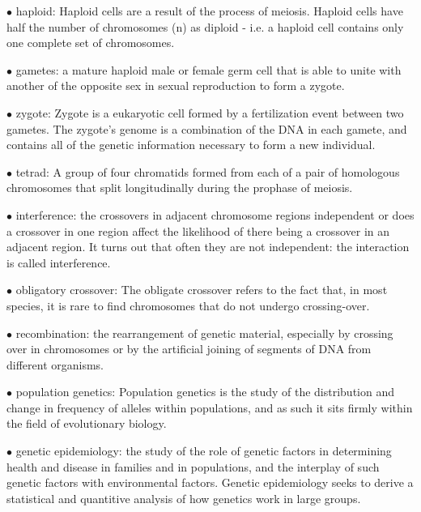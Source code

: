 \documentclass{article}
\begin{document}
\vspace{0.1in}
$\bullet$ haploid:
Haploid cells are a result of the process of meiosis. Haploid cells have half the number of chromosomes (n) as diploid - i.e. a haploid cell contains only one complete set of chromosomes.

\vspace{0.1in}
$\bullet$ gametes:
a mature haploid male or female germ cell that is able to unite with another of the opposite sex in sexual reproduction to form a zygote.


\vspace{0.1in}
$\bullet$ zygote:
 Zygote is a eukaryotic cell formed by a fertilization event between two gametes. The zygote's genome is a combination of the DNA in each gamete, and contains all of the genetic information necessary to form a new individual.

\vspace{0.1in}
$\bullet$ tetrad:
A group of four chromatids formed from each of a pair of homologous chromosomes that split longitudinally during the prophase of meiosis.


\vspace{0.1in}
$\bullet$ interference:
 the crossovers in adjacent chromosome regions independent or does a crossover in one region affect the likelihood of there being a crossover in an adjacent region. It turns out that often they are not independent: the interaction is called interference.


\vspace{0.1in}
$\bullet$ obligatory crossover:
The obligate crossover refers to the fact that, in most species, it is rare to find chromosomes that do not undergo crossing-over.


\vspace{0.1in}
$\bullet$ recombination:
the rearrangement of genetic material, especially by crossing over in chromosomes or by the artificial joining of segments of DNA from different organisms.


\vspace{0.1in}
$\bullet$ population genetics:
Population genetics is the study of the distribution and change in frequency of alleles within populations, and as such it sits firmly within the field of evolutionary biology.


\vspace{0.1in}
$\bullet$ genetic epidemiology:
 the study of the role of genetic factors in determining health and disease in families and in populations, and the interplay of such genetic factors with environmental factors. Genetic epidemiology seeks to derive a statistical and quantitive analysis of how genetics work in large groups.
 
\end{document}
